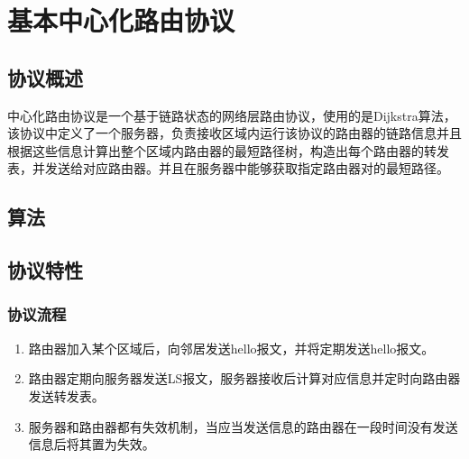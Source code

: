 \section{基本中心化路由协议}
\subsection{协议概述} %
	\label{sub:协议概述}
		中心化路由协议是一个基于链路状态的网络层路由协议，使用的是Dijkstra算法，该协议中定义了一个服务器，负责接收区域内运行该协议的路由器的链路信息并且根据这些信息计算出整个区域内路由器的最短路径树，构造出每个路由器的转发表，并发送给对应路由器。并且在服务器中能够获取指定路由器对的最短路径。
	\subsection{算法} %
	\label{sub:算法}

	\subsection{协议特性} %
	\label{sub:协议特性}
		\subsubsection{协议流程} %
		\label{ssub:协议流程}
			\begin{enumerate}
				\item 路由器加入某个区域后，向邻居发送hello报文，并将定期发送hello报文。
				\item 路由器定期向服务器发送LS报文，服务器接收后计算对应信息并定时向路由器发送转发表。
				\item 服务器和路由器都有失效机制，当应当发送信息的路由器在一段时间没有发送信息后将其置为失效。
			\end{enumerate}

